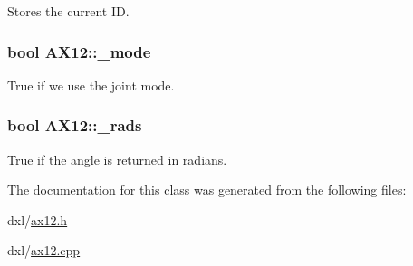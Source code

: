Stores the current I\+D. 

\hypertarget{a00001_a2fd07e2e636003227a32d09d211bd6d4}{}
\subsubsection[{\+\_\+mode}]{\setlength{\rightskip}{0pt plus 5cm}bool A\+X12\+::\+\_\+mode\hspace{0.3cm}{\ttfamily [private]}}\label{a00001_a2fd07e2e636003227a32d09d211bd6d4}


True if we use the joint mode. 

\hypertarget{a00001_aba71492043d7a3226f0793db57372bec}{}
\subsubsection[{\+\_\+rads}]{\setlength{\rightskip}{0pt plus 5cm}bool A\+X12\+::\+\_\+rads\hspace{0.3cm}{\ttfamily [private]}}\label{a00001_aba71492043d7a3226f0793db57372bec}


True if the angle is returned in radians. 



The documentation for this class was generated from the following files\+:\begin{DoxyCompactItemize}
\item 
dxl/\hyperlink{a00010}{ax12.\+h}\item 
dxl/\hyperlink{a00009}{ax12.\+cpp}\end{DoxyCompactItemize}
